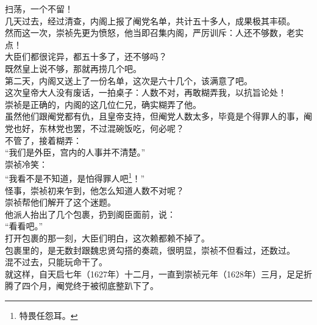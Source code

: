 \begin{multicols}{\theparacolNo}
扫荡，一个不留！\\

几天过去，经过清查，内阁上报了阉党名单，共计五十多人，成果极其丰硕。\\

然而这一次，崇祯先更为愤怒，他当即召集内阁，严厉训斥：人还不够数，老实点！\\

大臣们都很诧异，都五十多了，还不够吗？\\

既然皇上说不够，那就再捞几个吧。\\

第二天，内阁又送上了一份名单，这次是六十几个，该满意了吧。\\

这次皇帝大人没有废话，一拍桌子：人数不对，再敢糊弄我，以抗旨论处！\\

崇祯是正确的，内阁的这几位仁兄，确实糊弄了他。\\

虽然他们跟阉党都有仇，且皇帝支持，但阉党人数太多，毕竟是个得罪人的事，阉党也好，东林党也罢，不过混碗饭吃，何必呢？\\

不管了，接着糊弄：\\

“我们是外臣，宫内的人事并不清楚。”\\

崇祯冷笑：\\

“我看不是不知道，是怕得罪人吧\footnote{特畏任怨耳。}！”\\

怪事，崇祯初来乍到，他怎么知道人数不对呢？\\

崇祯帮他们解开了这个迷题。\\

他派人抬出了几个包裹，扔到阁臣面前，说：\\

“看看吧。”\\

打开包裹的那一刻，大臣们明白，这次赖都赖不掉了。\\

包裹里的，是无数封跟魏忠贤勾搭的奏疏，很明显，崇祯不但看过，还数过。\\

混不过去，只能玩命干了。\\

就这样，自天启七年（1627年）十二月，一直到崇祯元年（1628年）三月，足足折腾了四个月，阉党终于被彻底整趴下了。\\


\end{multicols}
